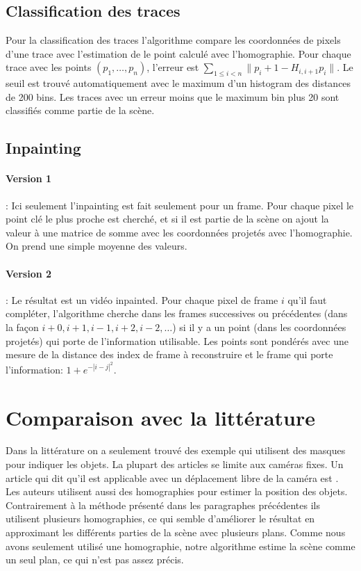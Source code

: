 \documentclass[8pt,twoside=off,titlepage=false, twocolumn]{scrartcl}
\begin{document}
\subsection{Classification des traces}

Pour la classification des traces l'algorithme compare les coordonnées de pixels d'une trace avec l'estimation de le point calculé avec l'homographie. Pour chaque trace avec les points $(p_1, \dots, p_n)$, l'erreur est $\sum_{1\le i < n} \| p_i+1 - H_{i, i+1} p_{i} \|$. Le seuil est trouvé automatiquement avec le maximum d'un histogram des distances de 200 bins. Les traces avec un erreur moins que le maximum bin plus 20 sont classifiés comme partie de la scène.

\subsection{Inpainting}

\paragraph{Version 1} : Ici seulement l'inpainting est fait seulement pour un frame. Pour chaque pixel le point clé le plus proche est cherché, et si il est partie de la scène on ajout la valeur à une matrice de somme avec les coordonnées projetés avec l'homographie. On prend une simple moyenne des valeurs.

\paragraph{Version 2} : Le résultat est un vidéo inpainted. Pour chaque pixel de frame $i$ qu'il faut compléter, l'algorithme cherche dans les frames successives ou précédentes (dans la façon $i+0, i+1, i-1, i+2, i-2, \dots$) si il y a un point (dans les coordonnées projetés) qui porte de l'information utilisable. Les points sont pondérés avec une mesure de la distance des index de frame à reconstruire et le frame qui porte l'information: $1+e^{-|i-j|^2}$.

\section{Comparaison avec la littérature}

Dans la littérature on a seulement trouvé des exemple qui utilisent des masques pour indiquer les objets. La plupart des articles se limite aux caméras fixes. Un article qui dit qu'il est applicable avec un déplacement libre de la caméra est \cite{background-inpainting}. Les auteurs utilisent aussi des homographies pour estimer la position des objets. Contrairement à la méthode présenté dans les paragraphes précédentes ils utilisent plusieurs homographies, ce qui semble d'améliorer le résultat en approximant les différents parties de la scène avec plusieurs plans. Comme nous avons seulement utilisé une homographie, notre algorithme estime la scène comme un seul plan, ce qui n'est pas assez précis.


    
    
\end{document}
